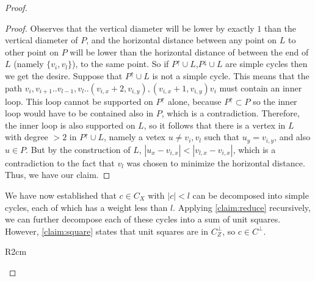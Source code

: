 \documentclass[12pt,a4paper]{article}
\begin{document}
\begin{proof}
\begin{proof}
Observes that the vertical diameter will be lower by exactly $1$ than the vertical diameter of $P$, and the horizontal distance between any point on $L$ to other point on $P$ will be lower than the horizontal distance of between the end of $L$ (namely $\{v_{i},v_{l}\}$), to the same point. So if $P^{\uparrow}\cup L$,$P^{\downarrow}\cup L$ are simple cycles then we get the desire. 
Suppose that $P^{\uparrow}\cup L$ is not a simple cycle. This means that the path $v_{i},v_{i+1}..v_{l-1},v_{l}.. \left( v_{i,x}+2, v_{i,y} \right), \left( v_{i,x}+1, v_{i,y} \right)v_{i}$ must contain an inner loop. This loop cannot be supported on $P^{\uparrow}$ alone, because $P^{\uparrow} \subset P$ so the inner loop would have to be contained also in $P$, which is a contradiction. Therefore, the inner loop is also supported on $L$, so it follows that there is a vertex in $L$ with degree $>2$ in $P^{\uparrow}\cup L$, namely a vetex $u \neq v_{i},v_{l}$ such that $u_{y} = v_{i,y}$, and also $u \in P$. But by the construction of $L$, $|u_{x} - v_{i,x}| < |v_{l,x} - v_{i,x}|$, which is a contradiction to the fact that $v_{l}$ was chosen to minimize the horizontal distance. Thus, we have our claim.
  \end{proof}


We have now established that $c \in C_{X}$ with $|c| < l$ can be decomposed into simple cycles, each of which has a weight less than $l$. Applying \cref{claim:reduce} recursively, we can further decompose each of these cycles into a sum of unit squares. However, \cref{claim:square} states that unit squares are in $C_{Z}^{\perp}$, so $c \in C^{\perp}$.
    \begin{wrapfigure}{R}{2cm}
\end{wrapfigure}
%


\end{proof}
\end{document}
